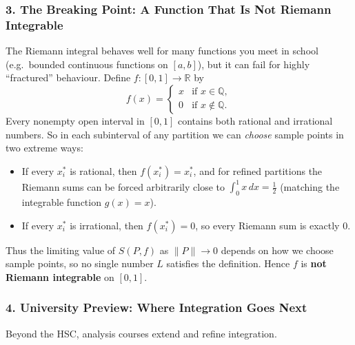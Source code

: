 \subsubsection*{3. The Breaking Point: A Function That Is Not Riemann Integrable}

The Riemann integral behaves well for many functions you meet in school (e.g.\ bounded continuous functions on $[a,b]$), but it can fail for highly ``fractured'' behaviour. Define $f \colon [0,1] \to \mathbb{R}$ by
\[
  f(x) =
  \begin{cases}
    x & \text{if $x \in \mathbb{Q}$}, \\
    0 & \text{if $x \notin \mathbb{Q}$}.
  \end{cases}
\]
Every nonempty open interval in $[0,1]$ contains both rational and irrational numbers. So in each subinterval of any partition we can \emph{choose} sample points in two extreme ways:
\begin{itemize}[leftmargin=*]
  \item If every $x_i^*$ is rational, then $f(x_i^*) = x_i^*$, and for refined partitions the Riemann sums can be forced arbitrarily close to $\int_0^1 x\,dx = \frac{1}{2}$ (matching the integrable function $g(x)=x$).
  \item If every $x_i^*$ is irrational, then $f(x_i^*) = 0$, so every Riemann sum is exactly $0$.
\end{itemize}
Thus the limiting value of $S(P,f)$ as $\|P\| \to 0$ depends on how we choose sample points, so no single number $L$ satisfies the definition. Hence $f$ is \textbf{not Riemann integrable} on $[0,1]$.

\subsubsection*{4. University Preview: Where Integration Goes Next}

Beyond the HSC, analysis courses extend and refine integration.

